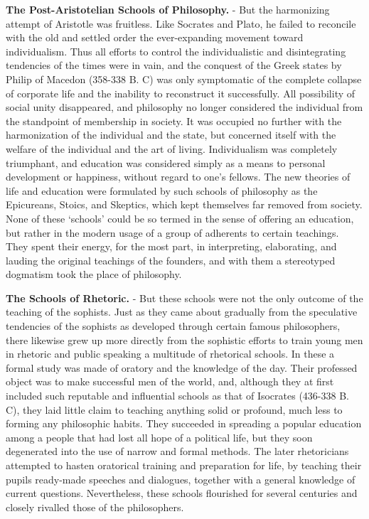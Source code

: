 \documentclass[]{book}
\begin{document}
\textbf{The Post-Aristotelian Schools of Philosophy.} - But the harmonizing attempt of Aristotle was fruitless. Like Socrates and Plato, he failed to reconcile with the old and settled order the ever-expanding movement toward individualism. Thus all efforts to control the individualistic and disintegrating tendencies of the times were in vain, and the conquest of the Greek states by Philip of Macedon (358-338 B. C) was only symptomatic of the complete collapse of corporate life and the inability to reconstruct it successfully. All possibility of social unity disappeared, and philosophy no longer considered the individual from the standpoint of membership in society. It was occupied no further with the harmonization of the individual and the state, but concerned itself with the welfare of the individual and the art of living. Individualism was completely triumphant, and education was considered simply as a means to personal development or happiness, without regard to one's fellows. The new theories of life and education were formulated by such schools of philosophy as the Epicureans, Stoics, and Skeptics, which kept themselves far removed from society. None of these `schools' could be so termed in the sense of offering an education, but rather in the modern usage of a group of adherents to certain teachings. They spent their energy, for the most part, in interpreting, elaborating, and lauding the original teachings of the founders, and with them a stereotyped dogmatism took the place of philosophy.

\textbf{The Schools of Rhetoric.} - But these schools were not the only outcome of the teaching of the sophists. Just as they came about gradually from the speculative tendencies of the sophists as developed through certain famous philosophers, there likewise grew up more directly from the sophistic efforts to train young men in rhetoric and public speaking a multitude of rhetorical schools. In these a formal study was made of oratory and the knowledge of the day. Their professed object was to make successful men of the world, and, although they at first included such reputable and influential schools as that of Isocrates (436-338 B. C), they laid little claim to teaching anything solid or profound, much less to forming any philosophic habits. They succeeded in spreading a popular education among a people that had lost all hope of a political life, but they soon degenerated into the use of narrow and formal methods. The later rhetoricians attempted to hasten oratorical training and preparation for life, by teaching their pupils ready-made speeches and dialogues, together with a general knowledge of current questions. Nevertheless, these schools flourished for several centuries and closely rivalled those of the philosophers.
\end{document}

